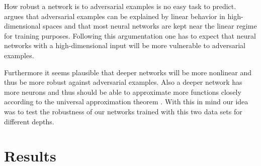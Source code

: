 \documentclass[%
 reprint,
 amsmath,amssymb,
 aps,
]{revtex4-1}
\begin{document}
How robust a network is to adversarial examples is no easy task to predict. \citeauthor{paperGrad} argues that adversarial examples can be explained by linear behavior in high-dimensional spaces and that most neural networks are kept near the linear regime for training purposes. Following this argumentation one has to expect that neural networks with a high-dimensional input will be more vulnerable to adversarial examples.

Furthermore it seems plausible that deeper networks will be more nonlinear and thus be more robust against adversarial examples. Also a deeper network has more neurons and thus should be able to approximate more functions closely according to the universal approximation theorem \cite{HORNIK1991251}. With this in mind our idea was to test the robustness of our networks trained with this two data sets for different depths.



\section{Results}
\end{document}
